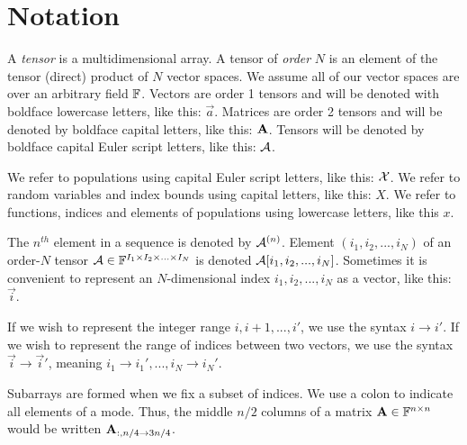   \section{Notation}
    A \textit{tensor} is a multidimensional array. A tensor of \textit{order} $N$ is an element of the tensor (direct) product of $N$ vector spaces. We assume all of our vector spaces are over an arbitrary field $\mathbb{F}$. Vectors are order 1 tensors and will be denoted with boldface lowercase letters, like this: $\vec{a}$. Matrices are order 2 tensors and will be denoted by boldface capital letters, like this: $\mathbf{A}$. Tensors will be denoted by boldface capital Euler script letters, like this: $\mathbf{\mathcal{A}}$.

    We refer to populations using capital Euler script letters, like this: $\mathcal{X}$. We refer to random variables and index bounds using capital letters, like this: $X$. We refer to functions, indices and elements of populations using lowercase letters, like this $x$.

    The $n^{th}$ element in a sequence is denoted by $\mathbf{\mathcal{A}}^{(n)}$.
    Element $(i_1, i_2, ..., i_N)$ of an order-$N$ tensor $\mathbf{\mathcal{A}} \in \mathbb{F}^{I_1 \times I_2 \times ... \times I_N}$ is denoted $ \mathbf{\mathcal{A}}[i_1, i_2, ..., i_N]$.
    Sometimes it is convenient to represent an $N$-dimensional index $i_1, i_2, ..., i_N$ as a vector, like this: $\vec{i}$.

    If we wish to represent the integer range $i, i + 1, ..., i'$, we use the syntax $i \to i'$. If we wish to represent the range of indices between two vectors, we use the syntax $\vec{i} \to \vec{i}'$, meaning $i_1 \to i_1', ..., i_N \to i_N'$.

    Subarrays are formed when we fix a subset of indices. We use a colon to indicate all elements of a mode. Thus, the middle $n/2$ columns of a matrix $\mathbf{A} \in \mathbb{F}^{n \times n}$ would be written $\mathbf{A}_{:, n/4 \to 3n/4}$.

